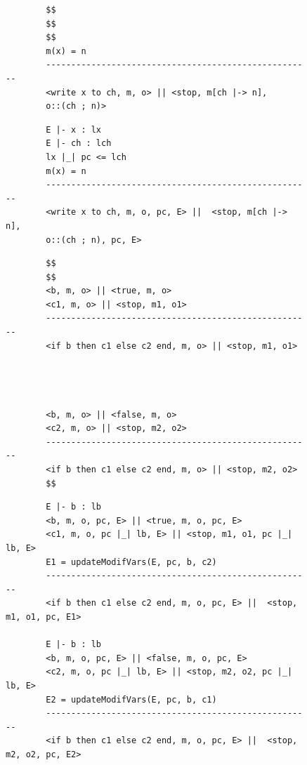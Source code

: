 \documentclass[sigplan,10pt,screen]{acmart}
\begin{document}
\begin{figure}
\begin{minipage}[t]{0.49\linewidth}
		\begin{lstlisting}
		$$
		$$
		$$
		m(x) = n
		-----------------------------------------------------
		<write x to ch, m, o> || <stop, m[ch |-> n], 
		o::(ch ; n)>
		\end{lstlisting}        
\end{minipage}
\hfill%
\begin{minipage}[t]{0.49\linewidth}
		\begin{lstlisting}
		E |- x : lx
		E |- ch : lch
		lx |_| pc <= lch
		m(x) = n
		-----------------------------------------------------
		<write x to ch, m, o, pc, E> ||  <stop, m[ch |-> n], 
		o::(ch ; n), pc, E>
		\end{lstlisting}
\end{minipage}
\end{figure}
\begin{figure}
\begin{minipage}[t]{0.49\linewidth}
		\begin{lstlisting}
		$$
		$$
		<b, m, o> || <true, m, o>
		<c1, m, o> || <stop, m1, o1>
		-----------------------------------------------------
		<if b then c1 else c2 end, m, o> || <stop, m1, o1>
		
		
		
		
		<b, m, o> || <false, m, o>
		<c2, m, o> || <stop, m2, o2>
		-----------------------------------------------------
		<if b then c1 else c2 end, m, o> || <stop, m2, o2>
		$$
		\end{lstlisting}        
\end{minipage}
\hfill%
\begin{minipage}[t]{0.49\linewidth}
		\begin{lstlisting}
		E |- b : lb
		<b, m, o, pc, E> || <true, m, o, pc, E>
		<c1, m, o, pc |_| lb, E> || <stop, m1, o1, pc |_| lb, E>
		E1 = updateModifVars(E, pc, b, c2)
		-----------------------------------------------------
		<if b then c1 else c2 end, m, o, pc, E> ||  <stop, m1, o1, pc, E1>
		
		E |- b : lb
		<b, m, o, pc, E> || <false, m, o, pc, E>
		<c2, m, o, pc |_| lb, E> || <stop, m2, o2, pc |_| lb, E>
		E2 = updateModifVars(E, pc, b, c1)
		-----------------------------------------------------
		<if b then c1 else c2 end, m, o, pc, E> ||  <stop, m2, o2, pc, E2>
		\end{lstlisting}
\end{minipage}
\end{figure}
\end{document}
